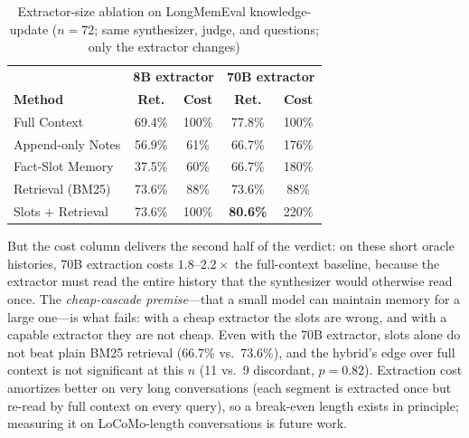 \documentclass[conference]{IEEEtran}
\begin{document}
\begin{table}[h]
\centering
\caption{Extractor-size ablation on LongMemEval knowledge-update ($n=72$; same synthesizer, judge, and questions; only the extractor changes)}
\label{tab:lme_ku_ablation}
\small
\setlength{\tabcolsep}{3pt}
\begin{tabular}{lcccc}
\toprule
& \multicolumn{2}{c}{\textbf{8B extractor}} & \multicolumn{2}{c}{\textbf{70B extractor}} \\
\textbf{Method} & \textbf{Ret.} & \textbf{Cost} & \textbf{Ret.} & \textbf{Cost} \\
\midrule
Full Context & 69.4\% & 100\% & 77.8\% & 100\% \\
Append-only Notes & 56.9\% & 61\% & 66.7\% & 176\% \\
Fact-Slot Memory & 37.5\% & 60\% & 66.7\% & 180\% \\
Retrieval (BM25) & 73.6\% & 88\% & 73.6\% & 88\% \\
Slots + Retrieval & 73.6\% & 100\% & \textbf{80.6\%} & 220\% \\
\bottomrule
\end{tabular}
\end{table}

But the cost column delivers the second half of the verdict: on these short oracle histories, 70B extraction costs $1.8$--$2.2\times$ the full-context baseline, because the extractor must read the entire history that the synthesizer would otherwise read once. The \emph{cheap-cascade premise}---that a small model can maintain memory for a large one---is what fails: with a cheap extractor the slots are wrong, and with a capable extractor they are not cheap. Even with the 70B extractor, slots alone do not beat plain BM25 retrieval (66.7\% vs.\ 73.6\%), and the hybrid's edge over full context is not significant at this $n$ (11 vs.\ 9 discordant, $p=0.82$). Extraction cost amortizes better on very long conversations (each segment is extracted once but re-read by full context on every query), so a break-even length exists in principle; measuring it on LoCoMo-length conversations is future work.
\end{document}
